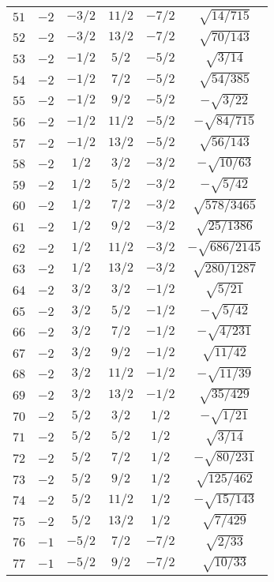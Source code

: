 \begin{table}
\begin{center}
\begin{tabular}{|c|c|c|c|c|c|}
$51$ & $-2$ & $-3/2$ & $11/2$ & $-7/2$ & $\sqrt{14/715}$ \\ 
$52$ & $-2$ & $-3/2$ & $13/2$ & $-7/2$ & $\sqrt{70/143}$ \\ 
$53$ & $-2$ & $-1/2$ & $5/2$ & $-5/2$ & $\sqrt{3/14}$ \\ 
$54$ & $-2$ & $-1/2$ & $7/2$ & $-5/2$ & $\sqrt{54/385}$ \\ 
$55$ & $-2$ & $-1/2$ & $9/2$ & $-5/2$ & $-\sqrt{3/22}$ \\ 
$56$ & $-2$ & $-1/2$ & $11/2$ & $-5/2$ & $-\sqrt{84/715}$ \\ 
$57$ & $-2$ & $-1/2$ & $13/2$ & $-5/2$ & $\sqrt{56/143}$ \\ 
$58$ & $-2$ & $1/2$ & $3/2$ & $-3/2$ & $-\sqrt{10/63}$ \\ 
$59$ & $-2$ & $1/2$ & $5/2$ & $-3/2$ & $-\sqrt{5/42}$ \\ 
$60$ & $-2$ & $1/2$ & $7/2$ & $-3/2$ & $\sqrt{578/3465}$ \\ 
$61$ & $-2$ & $1/2$ & $9/2$ & $-3/2$ & $\sqrt{25/1386}$ \\ 
$62$ & $-2$ & $1/2$ & $11/2$ & $-3/2$ & $-\sqrt{686/2145}$ \\ 
$63$ & $-2$ & $1/2$ & $13/2$ & $-3/2$ & $\sqrt{280/1287}$ \\ 
$64$ & $-2$ & $3/2$ & $3/2$ & $-1/2$ & $\sqrt{5/21}$ \\ 
$65$ & $-2$ & $3/2$ & $5/2$ & $-1/2$ & $-\sqrt{5/42}$ \\ 
$66$ & $-2$ & $3/2$ & $7/2$ & $-1/2$ & $-\sqrt{4/231}$ \\ 
$67$ & $-2$ & $3/2$ & $9/2$ & $-1/2$ & $\sqrt{11/42}$ \\ 
$68$ & $-2$ & $3/2$ & $11/2$ & $-1/2$ & $-\sqrt{11/39}$ \\ 
$69$ & $-2$ & $3/2$ & $13/2$ & $-1/2$ & $\sqrt{35/429}$ \\ 
$70$ & $-2$ & $5/2$ & $3/2$ & $1/2$ & $-\sqrt{1/21}$ \\ 
$71$ & $-2$ & $5/2$ & $5/2$ & $1/2$ & $\sqrt{3/14}$ \\ 
$72$ & $-2$ & $5/2$ & $7/2$ & $1/2$ & $-\sqrt{80/231}$ \\ 
$73$ & $-2$ & $5/2$ & $9/2$ & $1/2$ & $\sqrt{125/462}$ \\ 
$74$ & $-2$ & $5/2$ & $11/2$ & $1/2$ & $-\sqrt{15/143}$ \\ 
$75$ & $-2$ & $5/2$ & $13/2$ & $1/2$ & $\sqrt{7/429}$ \\ 
$76$ & $-1$ & $-5/2$ & $7/2$ & $-7/2$ & $\sqrt{2/33}$ \\ 
$77$ & $-1$ & $-5/2$ & $9/2$ & $-7/2$ & $\sqrt{10/33}$ \\ 

\end{tabular}
\end{center}
\end{table}
